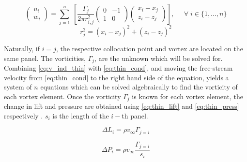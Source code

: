 \begin{equation}
\label{eq:v_ind_thin}
    \left(\begin{array}{l}
    u_i \\ w_i
    \end{array}\right)
    =
    \sum_{j=1}^{n} \:
    \left[ \frac{\Gamma_{j}}{2 \pi r_{i,j}^{2}}
    \left(\begin{array}{cc}
    0 & -1 \\ 1 & 0
    \end{array}\right)
    \left(\begin{array}{l}
    x_i-x_{j} \\ z_i-z_{j}
    \end{array}\right) \right], \; \; \; \; \; \forall \; i \in \{1,...,n\}
\end{equation}
\begin{equation}r_{j}^{2}=\left(x_i-x_j\right)^{2}+\left(z_i-z_j\right)^{2}\end{equation}
\medskip

Naturally, if $i=j$, the respective collocation point and vortex are located
on the same panel. The vorticities, $\Gamma_j$, are the unknown which will be solved for.
Combining \autoref{eq:v_ind_thin} with \autoref{eq:thin_cond}, and moving the free-stream
velocity from \autoref{eq:thin_cond} to the right hand side of the equation,  yields a
system of $n$ equations which can be solved algebraically to find the vorticity of each vortex element.
Once the vorticity $\Gamma_j$ is known for each vortex element, the change in lift and
pressure are obtained using \autoref{eq:thin_lift} and \autoref{eq:thin_press} respectively \cite{katz_plotkin}.
 $s_i$ is the length of the $i-$th panel.

\begin{minipage}{.5\linewidth}
\begin{equation}
\label{eq:thin_lift}
\Delta L_i = \rho v_\infty \Gamma_{j=i}
\end{equation}
\end{minipage}%
\begin{minipage}{.5\linewidth}
\begin{equation}
\label{eq:thin_press}
\Delta P_i = \rho v_\infty \frac{\Gamma_{j=i}}{s_i}
\end{equation}
\end{minipage}%

